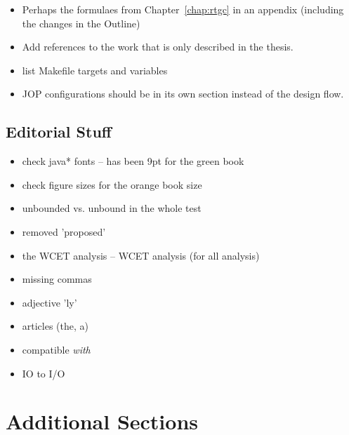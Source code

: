 \begin{itemize}
  \item Perhaps the formulaes from Chapter~\ref{chap:rtgc} in an
      appendix (including the changes in the Outline)
  \item Add references to the work that is only described in the
      thesis.
  \item list Makefile targets and variables
  \item JOP configurations should be in its own section instead
      of the design flow.
\end{itemize}

\subsection{Editorial Stuff}

\begin{itemize}
  \item check java* fonts -- has been 9pt for the green book
  \item check figure sizes for the orange book size
  \item unbounded vs. unbound in the whole test
  \item removed 'proposed'
  \item the WCET analysis -- WCET analysis (for all analysis)
  \item missing commas
  \item adjective 'ly'
  \item articles (the, a)
  \item compatible \emph{with}
  \item IO to I/O
\end{itemize}

\section{Additional Sections}

